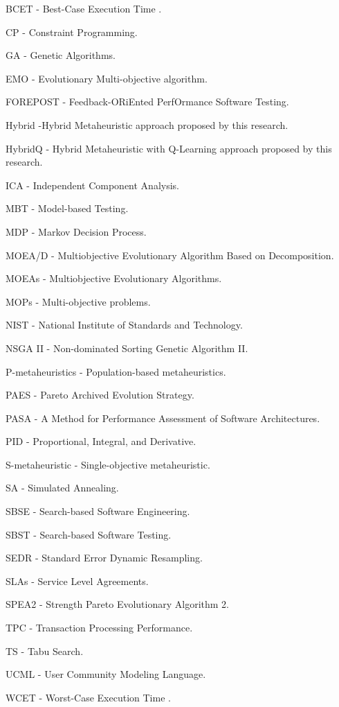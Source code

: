 
\begin{description}
 \item BCET - Best-Case Execution Time .
 \item CP - Constraint Programming.
 \item GA - Genetic Algorithms.
 \item EMO - Evolutionary Multi-objective algorithm.
 \item FOREPOST - Feedback-ORiEnted PerfOrmance Software Testing.
 \item Hybrid -Hybrid Metaheuristic approach proposed by this research.
 \item HybridQ - Hybrid Metaheuristic with Q-Learning approach proposed by this research.
 \item ICA - Independent Component Analysis.
 \item MBT - Model-based Testing.
 \item MDP - Markov Decision Process.
 \item MOEA/D - Multiobjective Evolutionary Algorithm Based on Decomposition.
 \item MOEAs - Multiobjective Evolutionary Algorithms. 
 \item MOPs - Multi-objective problems. 
 \item NIST -  National Institute of Standards and Technology. 
 \item NSGA II - Non-dominated Sorting Genetic Algorithm II.
 \item P-metaheuristics - Population-based metaheuristics.
 \item PAES - Pareto Archived Evolution Strategy.
 \item PASA - A Method for Performance Assessment of Software Architectures.
 \item PID - Proportional, Integral, and Derivative.
 \item S-metaheuristic -  Single-objective metaheuristic.
 \item SA - Simulated Annealing.
 \item SBSE - Search-based Software Engineering.
 \item SBST - Search-based Software Testing. 
 \item SEDR - Standard Error Dynamic Resampling.
 \item SLAs - Service Level Agreements.
 \item SPEA2 - Strength Pareto Evolutionary Algorithm 2.
 \item TPC - Transaction Processing Performance.
 \item TS - Tabu Search.
 \item UCML -  User Community Modeling Language.
 \item WCET - Worst-Case Execution Time .

 
\end{description}
